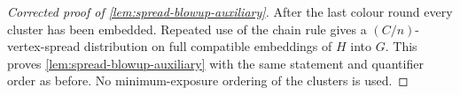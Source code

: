 \begin{proof}[Corrected proof of \cref{lem:spread-blowup-auxiliary}]
After the last colour round every cluster has been embedded.  Repeated use of
the chain rule gives a $(C/n)$-vertex-spread distribution on full compatible
embeddings of $H$ into $G$.  This proves
\cref{lem:spread-blowup-auxiliary} with the same statement and quantifier
order as before.  No minimum-exposure ordering of the clusters is used.
\end{proof}
